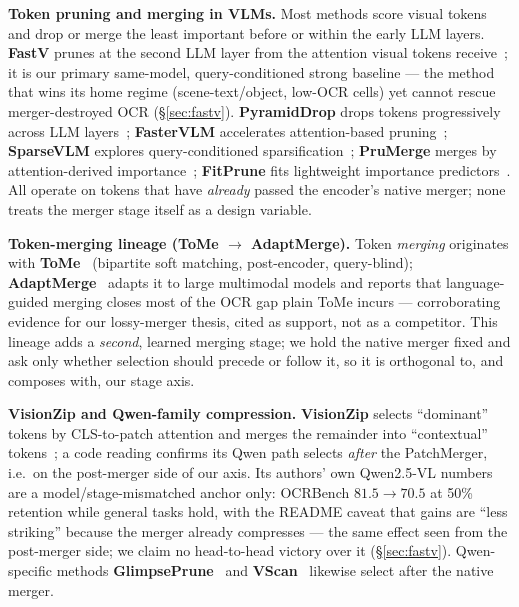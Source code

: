 \documentclass[sigconf,review,anonymous]{acmart}
\begin{document}
\textbf{Token pruning and merging in VLMs.} Most methods score visual tokens and
drop or merge the least important before or within the early LLM layers.
\textbf{FastV} prunes at the second LLM layer from the attention visual tokens
receive~\cite{chen2024fastv}; it is our primary same-model, query-conditioned
strong baseline --- the method that wins its home regime (scene-text/object,
low-OCR cells) yet cannot rescue merger-destroyed OCR (\S\ref{sec:fastv}).
\textbf{PyramidDrop} drops tokens progressively across LLM
layers~\cite{xing2024pyramiddrop}; \textbf{FasterVLM} accelerates
attention-based pruning~\cite{zhang2024fastervlm}; \textbf{SparseVLM} explores
query-conditioned sparsification~\cite{zhang2024sparsevlm}; \textbf{PruMerge}
merges by attention-derived importance~\cite{shang2024prumerge};
\textbf{FitPrune} fits lightweight importance
predictors~\cite{ye2024fitprune}. All operate on tokens that have \emph{already}
passed the encoder's native merger; none treats the merger stage itself as a
design variable.

\textbf{Token-merging lineage (ToMe $\to$ AdaptMerge).} Token \emph{merging}
originates with \textbf{ToMe}~\cite{bolya2023tome} (bipartite soft matching,
post-encoder, query-blind); \textbf{AdaptMerge}~\cite{islam2025adaptmerge}
adapts it to large multimodal models and reports that language-guided merging
closes most of the OCR gap plain ToMe incurs --- corroborating evidence for our
lossy-merger thesis, cited as support, not as a competitor. This lineage adds a
\emph{second}, learned merging stage; we hold the native merger fixed and ask
only whether selection should precede or follow it, so it is orthogonal to, and
composes with, our stage axis.

\textbf{VisionZip and Qwen-family compression.} \textbf{VisionZip} selects
``dominant'' tokens by CLS-to-patch attention and merges the remainder into
``contextual'' tokens~\cite{yang2024visionzip}; a code reading confirms its Qwen
path selects \emph{after} the PatchMerger, i.e.\ on the post-merger side of our
axis. Its authors' own Qwen2.5-VL numbers are a model/stage-mismatched anchor
only: OCRBench $81.5 \to 70.5$ at 50\% retention while general tasks hold, with
the README caveat that gains are ``less striking'' because the merger already
compresses --- the same effect seen from the post-merger side; we claim no
head-to-head victory over it (\S\ref{sec:fastv}). Qwen-specific methods
\textbf{GlimpsePrune}~\cite{zeng2025glimpseprune} and
\textbf{VScan}~\cite{zhang2025vscan} likewise select after the native merger.
\end{document}
